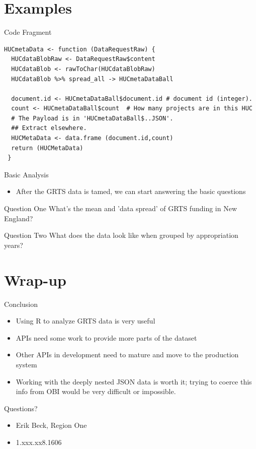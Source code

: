 \documentclass{beamer}
\begin{document}
\section{Examples}

\begin{frame}[fragile]{Code Fragment}
\begin{verbatim}
HUCmetaData <- function (DataRequestRaw) {
  HUCdataBlobRaw <- DataRequestRaw$content
  HUCdataBlob <- rawToChar(HUCdataBlobRaw)
  HUCdataBlob %>% spread_all -> HUCmetaDataBall
  
  document.id <- HUCmetaDataBall$document.id # document id (integer).
  count <- HUCmetaDataBall$count  # How many projects are in this HUC
  # The Payload is in 'HUCmetaDataBall$..JSON'. 
  ## Extract elsewhere.
  HUCMetaData <- data.frame (document.id,count) 
  return (HUCMetaData) 
 }

\end{verbatim}
\end{frame}

\begin{frame}{Basic Analysis}
  \begin{itemize}
    \item After the GRTS data is tamed, we can start answering the
      basic questions
  \end{itemize}
\end{frame}
\begin{frame}{Question One}
  What's the mean and 'data spread' of GRTS
  funding in New England?
\end{frame}

\begin{frame}{Question Two}
  What does the data look like when grouped by appropriation years?
\end{frame}
	 
\section{Wrap-up}

\begin{frame}{Conclusion}
  \begin{itemize}
  \item Using R to analyze GRTS data is very useful
  \item APIs need some work to provide more parts of the dataset
  \item Other APIs in development need to mature and move to the
    production system
  \item Working with the deeply nested JSON data is worth it; trying
    to coerce this info from OBI would be very difficult or
    impossible.
  \end{itemize}
\end{frame}


\begin{frame}{Questions?}
  \begin{itemize}
  \item Erik Beck, Region One
  \item 1.xxx.xx8.1606
  \end{itemize}
\end{frame}
 
\end{document}
